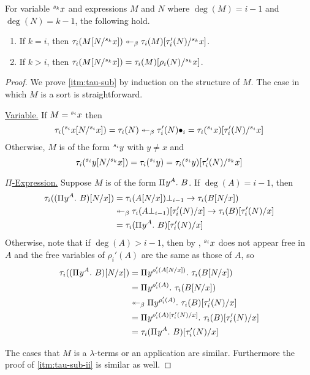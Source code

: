 \documentclass{article}
\begin{document}
\begin{lemma}\label{lem:tau-sub}
For variable ${}^{s_{k}}{x}$ and expressions $M$ and $N$ where $\deg(M) = i - 1$ and $\deg(N) = k - 1$, the following hold.
\begin{enumerate}
    \item\label{itm:tau-sub} If $k = i$, then $\tau_i(M[N/{}^{s_{k}}{x}]) \twoheadleftarrow_\beta \tau_i(M)[\tau_i'(N)/{}^{s_{k}}{x}]$.
    \item\label{itm:tau-sub-ii} If $k > i$, then $\tau_i(M[N/{}^{s_{k}}{x}]) = \tau_i(M)[\rho_i(N)/{}^{s_{k}}{x}]$.
\end{enumerate}
\end{lemma}

\begin{proof}
We prove \autoref{itm:tau-sub} by induction on the structure of $M$.
The case in which $M$ is a sort is straightforward.

\noindent\underline{Variable.} If $M = {}^{s_{i}}{x}$ then
\[
    \tau_i({}^{s_{i}}{x}[N/{}^{s_{i}}{x}]) =
    \tau_i(N) \twoheadleftarrow_\beta
    \tau_i'(N)\bullet_i =
    \tau_i({}^{s_{i}}{x})[\tau_i'(N)/{}^{s_{i}}{x}]
\]
Otherwise, $M$ is of the form ${}^{s_{i}}{y}$ with $y \not = x$ and
\[
    \tau_i({}^{s_{i}}{y}[N/{}^{s_{k}}{x}]) =
    \tau_i({}^{s_{i}}{y}) =
    \tau_i({}^{s_{i}}{y})[\tau_i'(N)/{}^{s_{k}}{x}]
\]

\noindent\underline{$\Pi$-Expression.} Suppose $M$ is of the form ${\Pi^{} {y}^{A}. \ {B}}$.
If $\deg(A) = i - 1$, then
\begin{align*}
\tau_i(({\Pi^{} {y}^{A}. \ {B}})[N/x]) &=
\tau_i(A[N/x])\bot_{i - 1} \to \tau_i(B[N/x]) \\ &\twoheadleftarrow_\beta
\tau_i(A\bot_{i - 1})[\tau_i'(N)/x] \to \tau_i(B)[\tau_i'(N)/x] \\ &=
\tau_i({\Pi^{} {y}^{A}. \ {B}})[\tau_i'(N)/x]
\end{align*}
Otherwise, note that if $\deg(A) > i - 1$, then by , ${}^{s_{i}}{x}$ does not appear free in $A$ and the free variables of $\rho_i'(A)$ are the same as those of $A$, so
\begin{align*}
\tau_i(({\Pi^{} {y}^{A}. \ {B}})[N/x]) &=
{\Pi^{} {y}^{\rho_i'(A[N/x])}. \ {\tau_i(B[N/x])}} \\ &= 
{\Pi^{} {y}^{\rho_i'(A)}. \ {\tau_i(B[N/x])}} \\ &\twoheadleftarrow_\beta
{\Pi^{} {y}^{\rho_i'(A)}. \ {\tau_i(B)[\tau_i'(N)/x]}} \\ &=
{\Pi^{} {y}^{\rho_i'(A)[\tau_i'(N)/x]}. \ {\tau_i(B)[\tau_i'(N)/x]}} \\ &=
\tau_i({\Pi^{} {y}^{A}. \ {B}})[\tau_i'(N)/x]
\end{align*}

The cases that $M$ is a $\lambda$-terms or an application are similar.
Furthermore the proof of \autoref{itm:tau-sub-ii} is similar as well.
\end{proof}
\end{document}
